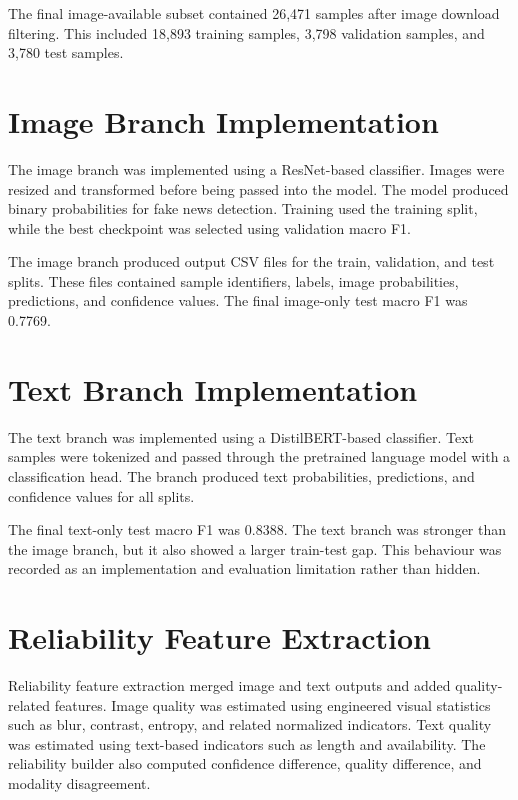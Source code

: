 The final image-available subset contained 26,471 samples after image download filtering. This included 18,893 training samples, 3,798 validation samples, and 3,780 test samples.


\section{Image Branch Implementation}


The image branch was implemented using a ResNet-based classifier. Images were resized and transformed before being passed into the model. The model produced binary probabilities for fake news detection. Training used the training split, while the best checkpoint was selected using validation macro F1.


The image branch produced output CSV files for the train, validation, and test splits. These files contained sample identifiers, labels, image probabilities, predictions, and confidence values. The final image-only test macro F1 was 0.7769.


\section{Text Branch Implementation}


The text branch was implemented using a DistilBERT-based classifier. Text samples were tokenized and passed through the pretrained language model with a classification head. The branch produced text probabilities, predictions, and confidence values for all splits.


The final text-only test macro F1 was 0.8388. The text branch was stronger than the image branch, but it also showed a larger train-test gap. This behaviour was recorded as an implementation and evaluation limitation rather than hidden.


\section{Reliability Feature Extraction}


Reliability feature extraction merged image and text outputs and added quality-related features. Image quality was estimated using engineered visual statistics such as blur, contrast, entropy, and related normalized indicators. Text quality was estimated using text-based indicators such as length and availability. The reliability builder also computed confidence difference, quality difference, and modality disagreement.


